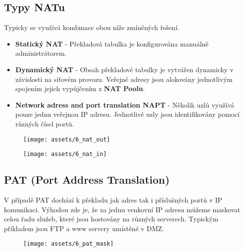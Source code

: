 \subsection{Typy NATu}
Typicky se využívá kombinace obou níže zmíněných řešení.
\begin{itemize}
    \item \textbf{Statický NAT} - Překladová tabulka je konfigurována manuálně administrátorem.
    \item \textbf{Dynamický NAT} - Obsah překladové tabulky je vytvářen dynamicky v závislosti na síťovém provozu. Veřejné adresy jsou alokovány jednotlivým spojením jejich vypůjčením z \textbf{NAT Poolu}.
    \item \textbf{Network adress and port translation NAPT} - Několik uzlů využívá pouze jednu veřejnou IP adresu. Jednotlivé uzly jsou identifikovány pomocí různých čísel portů.
\end{itemize}

\begin{figure}[H]
    \centering
    \texttt{[image: assets/6\_nat\_out]}
\end{figure}

\begin{figure}[H]
    \centering
    \texttt{[image: assets/6\_nat\_in]}
\end{figure}

\subsection{PAT (Port Address Translation)}
V případě PAT dochází k překladu jak adres tak i příslušných portů v IP komunikaci. Výhodou zde je, že za jednu venkovní IP adresu můžeme maskovat celou řadu služeb, které jsou hostovány na různých serverech. Typickým příkladem jsou FTP a www servery umístěné v DMZ.
\begin{figure}[H]
    \centering
    \texttt{[image: assets/6\_pat\_mask]}
\end{figure}